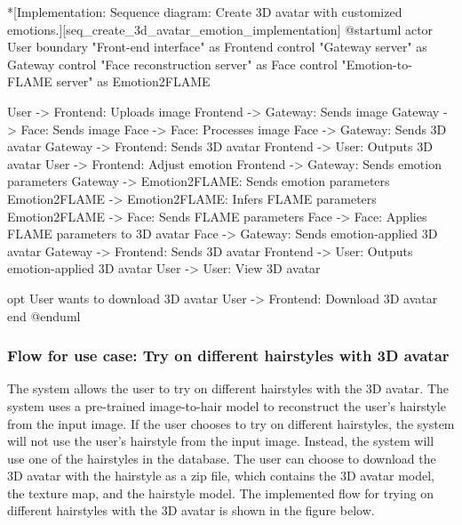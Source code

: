 \begin{umlfigure}*[Implementation: Sequence diagram: Create 3D avatar with customized emotions.][seq_create_3d_avatar_emotion_implementation]
    @startuml
    actor User
    boundary "Front-end interface" as Frontend
    control "Gateway server" as Gateway
    control "Face reconstruction server" as Face
    control "Emotion-to-FLAME server" as Emotion2FLAME

    User -> Frontend: Uploads image
    Frontend -> Gateway: Sends image
    Gateway -> Face: Sends image
    Face -> Face: Processes image
    Face -> Gateway: Sends 3D avatar
    Gateway -> Frontend: Sends 3D avatar
    Frontend -> User: Outputs 3D avatar
    User -> Frontend: Adjust emotion
    Frontend -> Gateway: Sends emotion parameters
    Gateway -> Emotion2FLAME: Sends emotion parameters
    Emotion2FLAME -> Emotion2FLAME: Infers FLAME parameters
    Emotion2FLAME -> Face: Sends FLAME parameters
    Face -> Face: Applies FLAME parameters to 3D avatar
    Face -> Gateway: Sends emotion-applied 3D avatar
    Gateway -> Frontend: Sends 3D avatar
    Frontend -> User: Outputs emotion-applied 3D avatar
    User -> User: View 3D avatar

    opt User wants to download 3D avatar
    User -> Frontend: Download 3D avatar
    end
    @enduml
\end{umlfigure}

\clearpage

\subsubsection{Flow for use case: Try on different hairstyles with 3D avatar}

The system allows the user to try on different hairstyles with the 3D avatar. The system uses a pre-trained image-to-hair model to reconstruct the user's hairstyle from the input image. If the user chooses to try on different hairstyles, the system will not use the user's hairstyle from the input image. Instead, the system will use one of the hairstyles in the database. The user can choose to download the 3D avatar with the hairstyle as a zip file, which contains the 3D avatar model, the texture map, and the hairstyle model. The implemented flow for trying on different hairstyles with the 3D avatar is shown in the figure below.

\clearpage

